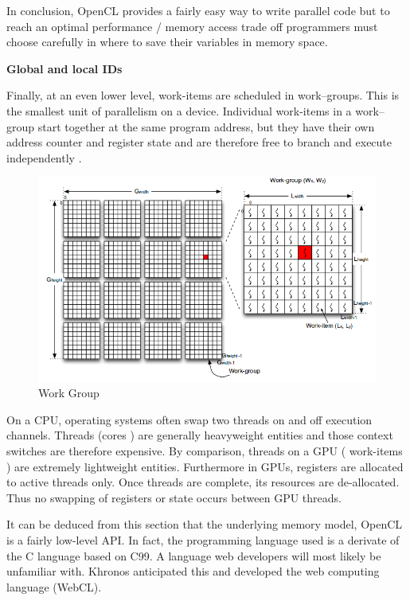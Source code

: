 In conclusion, OpenCL provides a fairly easy way to write parallel code but to
reach an optimal performance / memory access trade off programmers must choose
carefully in where to save their variables in memory space.

\textbf{Global and local IDs}

Finally, at an even lower level, work-items are scheduled in work–groups.
This is the smallest unit of parallelism on a device. Individual work-items in
a work–group  start together at the same program address, but they have their
own address counter and register state and are therefore free to branch and
execute independently \citep{Reference4}.

\begin{figure}[H] \centering
  \includegraphics[width=\textwidth]{./Figures/id.png} 
  \caption[Work - group]{Work Group \citep{Reference4}} 
  \label{fig:id} 
\end{figure}


On a CPU, operating systems often swap two threads on and off execution
channels. Threads (cores ) are generally heavyweight entities and those context
switches are therefore expensive. By comparison, threads on a GPU ( work-items
) are extremely lightweight entities. Furthermore in GPUs, registers are
allocated to active threads only. Once threads are complete, its resources are
de-allocated.  Thus no swapping of registers or state occurs between GPU
threads. \citep{Reference4}

It can be deduced from this section that the underlying memory model, OpenCL is a
fairly low-level API. In fact, the programming language used is a derivate of
the C language based on C99. A language web developers will most likely be
unfamiliar with. Khronos anticipated this and developed the web computing
language (WebCL).

